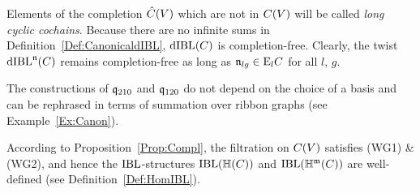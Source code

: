 \documentclass[\MainFolder/Text.tex]{subfiles}
\begin{document}
\begin{Remark}
\begin{RemarkList}
\item Elements of the completion $\hat{C}(V)$ which are not in $C(V)$ will be called \emph{long cyclic cochains}. Because there are no infinite sums in Definition~\ref{Def:CanonicaldIBL}, $\mathrm{dIBL}(C)$ is completion-free. Clearly, the twist $\mathrm{dIBL}^{\mathfrak{n}}(C)$ remains completion-free as long as $\mathfrak{n}_{lg}\in \mathrm{E}_l C$ for all $l$, $g$.
\item The constructions of $\mathfrak{q}_{210}$ and $\mathfrak{q}_{120}$ do not depend on the choice of a basis and can be rephrased in terms of summation over ribbon graphs (see Example~\ref{Ex:Canon}).
\item According to Proposition~\ref{Prop:Compl}, the filtration on $C(V)$ satisfies (WG1) \& (WG2), and hence the $\mathrm{IBL}$-structures $\mathrm{IBL}(\mathbb{H}(C))$ and $\mathrm{IBL}(\mathbb{H}^{\mathfrak{m}}(C))$ are well-defined (see Definition~\ref{Def:HomIBL}).\qedhere
\end{RemarkList}
\end{Remark}
\end{document}
